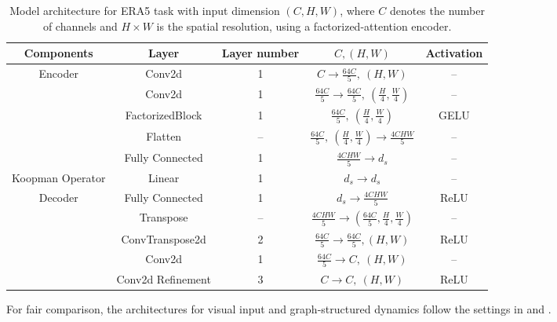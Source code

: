 \documentclass{article} %
\begin{document}
\begin{table}[h]
\small
\centering
\caption{Model architecture for ERA5 task with input dimension $(C,H,W)$, where $C$ denotes the number of channels and $H \times W$ is the spatial resolution, using a factorized-attention encoder.}
\renewcommand{\arraystretch}{1}
\begin{tabular}{|c|c|c|c|c|}
\hline
\textbf{Components} & \textbf{Layer} & \textbf{Layer number} & \textbf{$C,(H,W)$} & \textbf{Activation} \\
\hline
\multirow{5}{*}{Encoder} 
& Conv2d & 1 
& $C \rightarrow \frac{64C}{5},\ (H,W)$ 
& -- \\[0.3em]
& Conv2d & 1 
& $\frac{64C}{5} \rightarrow \frac{64C}{5},\ (\frac{H}{4},\frac{W}{4})$ 
& -- \\[0.3em]
& FactorizedBlock 
& 1 
& $\frac{64C}{5},\ (\frac{H}{4},\frac{W}{4})$ 
& GELU \\[0.3em]
& Flatten 
& -- 
& $\frac{64C}{5},\ (\frac{H}{4},\frac{W}{4}) \rightarrow \frac{4CHW}{5}$ 
& -- \\[0.3em]
& Fully Connected 
& 1 
& $\frac{4CHW}{5} \rightarrow d_s$ 
& -- \\[0.3em]
\hline
\multirow{1}{*}{Koopman Operator} 
& Linear 
& 1 
& $d_s \rightarrow d_s$ 
& -- \\[0.3em]
\hline
\multirow{8}{*}{Decoder} 
& Fully Connected 
& 1 
& $d_s \rightarrow \frac{4CHW}{5}$ 
& ReLU \\[0.3em]
& Transpose 
& -- 
& $\frac{4CHW}{5} \rightarrow (\frac{64C}{5}, \frac{H}{4},\frac{W}{4})$ 
& -- \\[0.3em]
& ConvTranspose2d
& 2 
& $\frac{64C}{5} \rightarrow \frac{64C}{5}, (H,W)$ 
& ReLU \\[0.3em]
& Conv2d
& 1 
& $\frac{64C}{5} \rightarrow C,\ (H,W)$ 
& -- \\[0.3em]
& Conv2d Refinement 
& 3 
& $C \rightarrow C,\ (H,W)$ 
& ReLU \\[0.3em]
\hline
\end{tabular}
\label{tab:era5_factorized_architecture}
\end{table}


For fair comparison, the architectures for visual input and graph-structured dynamics follow the settings in \cite{levine2019prediction} and \cite{li2019learning}.

\end{document}
